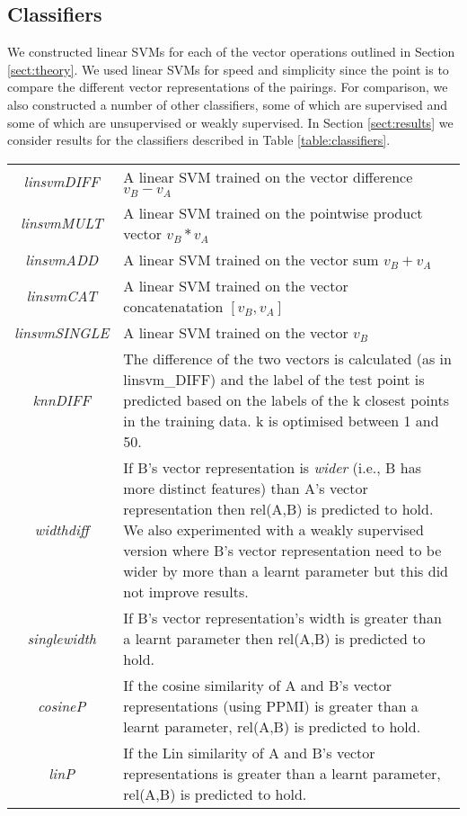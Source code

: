 \documentclass[11pt]{article}
\begin{document}
\subsection{Classifiers}

We constructed linear SVMs for each of the vector operations outlined in Section \ref{sect:theory}.  We used linear SVMs for speed and simplicity since the point is to compare the different vector representations of the pairings.  For comparison, we also constructed a number of other classifiers, some of which are supervised and some of which are unsupervised or weakly supervised.  In Section \ref{sect:results} we consider results for the classifiers described in Table \ref{table:classifiers}.

\begin{table*}[ht]
\centering
\begin{tabular}{|c|p{14cm}|}
\hline
\emph{linsvmDIFF}& A linear SVM trained on the vector difference $v_B - v_A$\\
\emph{linsvmMULT}& A linear SVM trained on the pointwise product vector $v_B * v_A$\\
\emph{linsvmADD}& A linear SVM trained on the vector sum $v_B + v_A$\\
\emph{linsvmCAT}& A linear SVM trained on the vector concatenatation $[v_B,v_A]$\\
\emph{linsvmSINGLE}& A linear SVM trained on the vector $v_B$\\
\emph{knnDIFF}& The difference of the two vectors is calculated (as in linsvm\_DIFF) and the label of the test point is predicted based on the labels of the k closest points in the training data. k is optimised between 1 and 50.\\
\hline
\emph{widthdiff}& If B's vector representation is \textit{wider} (i.e., B has more distinct features) than A's vector representation then rel(A,B) is predicted to hold.  We also experimented with a weakly supervised version where B's vector representation need to be wider by more than a learnt parameter but this did not improve results.\\
\emph{singlewidth}& If B's vector representation's width is greater than a learnt parameter then rel(A,B) is predicted to hold.\\
\emph{cosineP}& If the cosine similarity of A and B's vector representations (using PPMI) is greater than a learnt parameter, rel(A,B) is predicted to hold.\\
\emph{linP}&If the Lin similarity \cite{Lin1998} of A and B's vector representations is greater than a learnt parameter, rel(A,B) is predicted to hold.\\

\end{tabular}
\end{table*}
\end{document}
